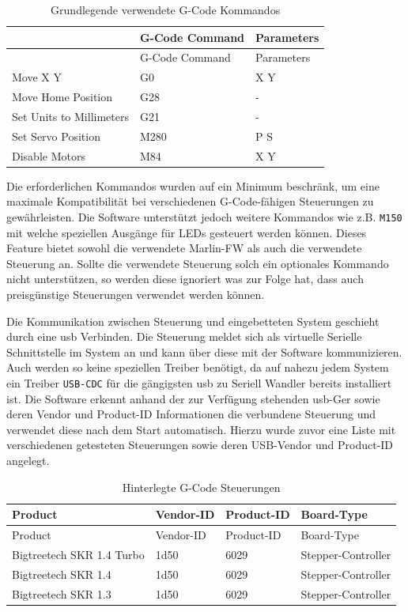 \begin{longtable}[]{@{}lll@{}}
\caption{Grundlegende verwendete G-Code Kommandos}\tabularnewline
\toprule
& G-Code Command & Parameters\tabularnewline
\midrule
\endfirsthead
\toprule
& G-Code Command & Parameters\tabularnewline
\midrule
\endhead
Move X Y & G0 & X Y\tabularnewline
Move Home Position & G28 & -\tabularnewline
Set Units to Millimeters & G21 & -\tabularnewline
Set Servo Position & M280 & P S\tabularnewline
Disable Motors & M84 & X Y\tabularnewline
\bottomrule
\end{longtable}

Die erforderlichen Kommandos wurden auf ein Minimum beschränk, um eine
maximale Kompatibilität bei verschiedenen G-Code-fähigen Steuerungen zu
gewährleisten. Die Software unterstützt jedoch weitere Kommandos wie
z.B. \passthrough{\lstinline!M150!} mit welche speziellen Ausgänge für
LEDs gesteuert werden können. Dieses Feature bietet sowohl die
verwendete Marlin-FW\cite{marlinfw} als auch die verwendete
Steuerung an. Sollte die verwendete Steuerung solch ein optionales
Kommando nicht unterstützen, so werden diese ignoriert was zur Folge
hat, dass auch preisgünstige Steuerungen verwendet werden können.

Die Kommunikation zwischen Steuerung und eingebetteten System geschieht
durch eine \gls{usb} Verbinden. Die Steuerung meldet sich als virtuelle
Serielle Schnittstelle im System an und kann über diese mit der Software
kommunizieren. Auch werden so keine speziellen Treiber benötigt, da auf
nahezu jedem System ein Treiber \passthrough{\lstinline!USB-CDC!} für
die gängigsten \gls{usb} zu Seriell Wandler bereits installiert ist. Die
Software erkennt anhand der zur Verfügung stehenden \gls{usb}-Ger sowie
deren Vendor und Product-ID Informationen die verbundene Steuerung und
verwendet diese nach dem Start automatisch. Hierzu wurde zuvor eine
Liste mit verschiedenen getesteten Steuerungen sowie deren USB-Vendor
und Product-ID angelegt.

\begin{longtable}[]{@{}llll@{}}
\caption{Hinterlegte G-Code Steuerungen}\tabularnewline
\toprule
Product & Vendor-ID & Product-ID & Board-Type\tabularnewline
\midrule
\endfirsthead
\toprule
Product & Vendor-ID & Product-ID & Board-Type\tabularnewline
\midrule
\endhead
Bigtreetech SKR 1.4 Turbo & 1d50 & 6029 &
Stepper-Controller\tabularnewline
Bigtreetech SKR 1.4 & 1d50 & 6029 & Stepper-Controller\tabularnewline
Bigtreetech SKR 1.3 & 1d50 & 6029 & Stepper-Controller\tabularnewline
\bottomrule
\end{longtable}


